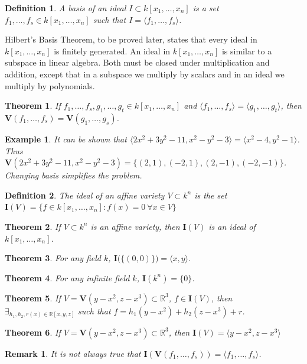 \documentclass[oneside]{book}
\theoremstyle{mystyle}
\newtheorem{theorem}{Theorem}[section]
\newtheorem{definition}{Definition}[section]
\newtheorem{example}{Example}[section]
\newtheorem{remark}{Remark}[section]
\begin{document}
\begin{definition}
A basis of an ideal $I\subset k[x_1,\hdots ,x_n]$ is a set $f_1,\hdots, f_s\in k[x_1,\hdots ,x_n]$ such that $I = \langle f_1,\hdots, f_s\rangle$.
\end{definition}
Hilbert's Basis Theorem, to be proved later, states that every ideal in $k[x_1,\hdots ,x_n]$ is finitely generated. An ideal in $k[x_1,\hdots ,x_n]$ is similar to a subspace in linear algebra. Both must be closed under multiplication and addition, except that in a subspace we multiply by scalars and in an ideal we multiply by polynomials. 
\begin{theorem}
If $f_1,\hdots, f_s ,g_1,\hdots, g_t \in k[x_1,\hdots ,x_n]$ and $\langle f_1,\hdots, f_s\rangle = \langle g_1,\hdots, g_t\rangle$, then $\mathbf{V}(f_1,\hdots, f_s) = \mathbf{V}(g_1,\hdots, g_s)$.
\end{theorem}
\begin{example}
It can be shown that $\langle2x^2+3y^2-11,x^2-y^2-3\rangle = \langle x^2-4,y^2-1\rangle$. Thus $\mathbf{V}(2x^2+3y^2-11,x^2-y^2-3) = \{(2,1),(-2,1),(2,-1),(-2,-1)\}$. Changing basis simplifies the problem.
\end{example}
\begin{definition}
The ideal of an affine variety $V \subset k^n$ is the set $\mathbf{I}(V)=\{f\in k[x_1,\hdots ,x_n]:f(x)=0\ \forall{x\in V}\}$
\end{definition}
\begin{theorem}
If $V\subset k^n$ is an affine variety, then $\mathbf{I}(V)$ is an ideal of $k[x_1,\hdots ,x_n]$.
\end{theorem}
\begin{theorem}
For any field $k$, $\mathbf{I}\big(\{(0,0)\}\big) = \langle x,y\rangle$.
\end{theorem}
\begin{theorem}
For any infinite field $k$, $\mathbf{I}(k^n) = \{0\}$.
\end{theorem}
\begin{theorem}
If $V = \mathbf{V}(y-x^2,z-x^3)\subset \mathbb{R}^3$, $f\in \mathbf{I}(V)$, then $\exists_{h_1,h_2,r(x)\in \mathbb{R}[x,y,z]}$ such that $f=h_1(y-x^2)+h_2(z-x^3)+r$.
\end{theorem}
\begin{theorem}
If $V = \mathbf{V}(y-x^2,z-x^3)\subset \mathbb{R}^3$, then $\mathbf{I}(V) = \langle y-x^2,z-x^3\rangle$
\end{theorem}
\begin{remark}
It is not always true that $\mathbf{I}(\mathbf{V}(f_1,\hdots, f_s)) = \langle f_1,\hdots, f_s\rangle$.
\end{remark}
\end{document}
